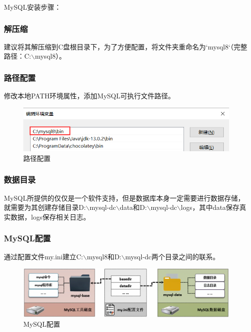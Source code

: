 \documentclass[12pt, openany, oneside]{book}
\begin{document}
MySQL安装步骤：

\subsubsection{解压缩}

建议将其解压缩到C盘根目录下，为了方便配置，将文件夹重命名为`mysql8`（完整路径：C:$ \backslash $mysql8）。

\subsubsection{路径配置}

修改本地PATH环境属性，添加MySQL可执行文件路径。 \\

\begin{figure}[H]
    \centering
    \includegraphics[]{img/C2/3.png}
    \caption{路径配置}
\end{figure}

\subsubsection{数据目录}

MySQL所提供的仅仅是一个软件支持，但是数据库本身一定需要进行数据存储，就需要为其创建存储目录D:$ \backslash $mysql-dc$ \backslash $data和D:$ \backslash $mysql-dc$ \backslash $logs，其中data保存真实数据，logs保存相关日志。

\subsubsection{MySQL配置}

通过配置文件my.ini建立C:$ \backslash $mysql8和D:$ \backslash $mysql-dc两个目录之间的联系。 \\

\begin{figure}[H]
    \centering
    \includegraphics[]{img/C2/4.png}
    \caption{MySQL配置}
\end{figure}
\end{document}
